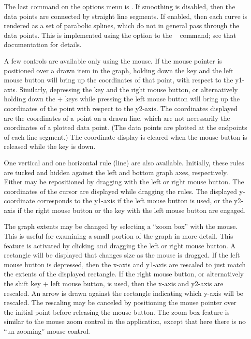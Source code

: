 The last command on the options menu is .  If
smoothing is disabled, then the data points are connected by straight
line segments.  If enabled, then each curve is rendered as a set of
parabolic splines, which do not in general pass through the data points.
This is implemented using the  option to the
\Tcl\  command; see that documentation for
details.

A few controls are available only using the mouse.  If the mouse pointer
is positioned over a drawn item in the graph, holding down the
 key and the left mouse button will bring up the
coordinates of that point, with respect to the y1-axis.  Similarly,
depressing the  key and the right mouse button, or
alternatively holding down the + keys while
pressing the left mouse button will bring up the coordinates of the
point with respect to the y2-axis.  The coordinates displayed are the
coordinates of a point on a drawn line, which are not necessarily the
coordinates of a plotted data point.  (The data points are plotted at
the endpoints of each line segment.)  The coordinate display is cleared
when the mouse button is released while the  key is down.

One vertical and one horizontal rule (line) are also available.
Initially, these rules are tucked and hidden against the left and bottom
graph axes, respectively.  Either may be repositioned by dragging with
the left or right mouse button.  The coordinates of the cursor are
displayed while dragging the rules.  The displayed y-coordinate
corresponds to the y1-axis if the left mouse button is used, or the
y2-axis if the right mouse button or the  key with the left
mouse button are engaged.

The graph extents may be changed by selecting a ``zoom box'' with the
mouse.  This is useful for examining a small portion of the graph in
more detail.  This feature is activated by clicking and dragging the
left or right mouse button.  A rectangle will be displayed that changes
size as the mouse is dragged.  If the left mouse button is depressed,
then the x-axis and y1-axis are rescaled to just match the extents of
the displayed rectangle.  If the right mouse button, or alternatively
the shift key + left mouse button, is used, then the x-axis and y2-axis
are rescaled.  An arrow is drawn against the rectangle indicating which
y-axis will be rescaled.  The rescaling may be canceled by positioning
the mouse pointer over the initial point before releasing the mouse
button.  The zoom box feature is similar to the mouse zoom control in
the
 application, except
that here there is no ``un-zooming'' mouse control.

